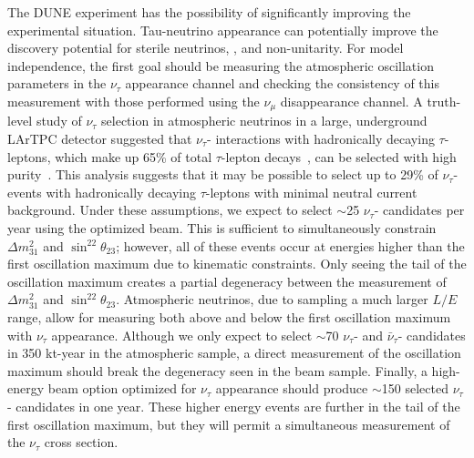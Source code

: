 The DUNE experiment has the possibility of significantly improving the experimental situation.  Tau-neutrino appearance can potentially improve the discovery potential for sterile neutrinos,  , and non-unitarity.  For model independence, the first goal should be measuring the atmospheric oscillation parameters in the $\nu_{\tau}$ appearance channel and checking the consistency of this measurement with those performed using the $\nu_{\mu}$ disappearance channel.  A truth-level study of $\nu_{\tau}$ selection in atmospheric neutrinos in a large, underground LArTPC detector suggested that $\nu_{\tau}$- interactions with hadronically decaying $\tau$-leptons, which make up 65\% of total $\tau$-lepton decays~\cite{Tanabashi:2018oca}, can be selected with high purity~\cite{Conrad:1008}.  This analysis suggests that it may be possible to select up to 29\% of $\nu_{\tau}$- events with hadronically decaying $\tau$-leptons with minimal neutral current background.  Under these assumptions, we expect to select $\sim$25 $\nu_{\tau}$- candidates per year using the  optimized beam.  This is sufficient to %
simultaneously constrain $\Delta m^2_{31}$ and $\sin^22\theta_{23}$; however, all of these events occur at energies higher than the first oscillation maximum due to kinematic constraints.  Only seeing the tail of the oscillation maximum creates a partial degeneracy between the measurement of  $\Delta m^2_{31}$ and $\sin^22\theta_{23}$.  Atmospheric neutrinos, due to sampling a much larger $L/E$ range, allow for measuring both above and below the first oscillation maximum with $\nu_{\tau}$ appearance.  Although  we only expect to select $\sim$70 $\nu_{\tau}$- and $\bar{\nu}_{\tau}$- candidates in 350 kt-year in the atmospheric sample,  a direct measurement of the oscillation maximum should break the degeneracy seen in the beam sample.  Finally, a high-energy beam option optimized for $\nu_{\tau}$ appearance should produce $\sim$150 selected  $\nu_{\tau}$- candidates in one year.  These higher energy events are further in the tail of the first oscillation maximum, but they will permit a simultaneous measurement of the $\nu_{\tau}$ cross section. 

